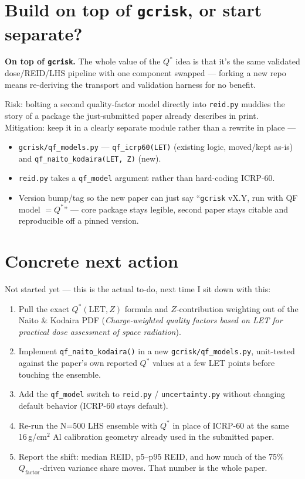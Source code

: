 \documentclass[12pt]{article}
\begin{document}
\section{Build on top of \texttt{gcrisk}, or start separate?}

\textbf{On top of \texttt{gcrisk}.} The whole value of the $Q^*$ idea is
that it's the same validated dose/REID/LHS pipeline with one component
swapped --- forking a new repo means re-deriving the transport and
validation harness for no benefit.

Risk: bolting a second quality-factor model directly into \texttt{reid.py}
muddies the story of a package the just-submitted paper already describes
in print. Mitigation: keep it in a clearly separate module rather than a
rewrite in place ---

\begin{itemize}[itemsep=2pt]
    \item \texttt{gcrisk/qf\_models.py} --- \texttt{qf\_icrp60(LET)} (existing
    logic, moved/kept as-is) and \texttt{qf\_naito\_kodaira(LET, Z)} (new).
    \item \texttt{reid.py} takes a \texttt{qf\_model} argument rather than
    hard-coding ICRP-60.
    \item Version bump/tag so the new paper can just say ``\texttt{gcrisk}
    vX.Y, run with QF model $=Q^*$'' --- core package stays legible, second
    paper stays citable and reproducible off a pinned version.
\end{itemize}

\section{Concrete next action}

Not started yet --- this is the actual to-do, next time I sit down with
this:

\begin{enumerate}[itemsep=3pt]
    \item Pull the exact $Q^*(\text{LET}, Z)$ formula and $Z$-contribution
    weighting out of the Naito \& Kodaira PDF (\textit{Charge-weighted
    quality factors based on LET for practical dose assessment of space
    radiation}).
    \item Implement \texttt{qf\_naito\_kodaira()} in a new
    \texttt{gcrisk/qf\_models.py}, unit-tested against the paper's own
    reported $Q^*$ values at a few LET points before touching the ensemble.
    \item Add the \texttt{qf\_model} switch to \texttt{reid.py} /
    \texttt{uncertainty.py} without changing default behavior (ICRP-60
    stays default).
    \item Re-run the N=500 LHS ensemble with $Q^*$ in place of ICRP-60 at
    the same 16\,g/cm$^2$ Al calibration geometry already used in the
    submitted paper.
    \item Report the shift: median REID, p5--p95 REID, and how much of the
    75\% $Q_{\text{factor}}$-driven variance share moves. That number is
    the whole paper.
\end{enumerate}
\end{document}
